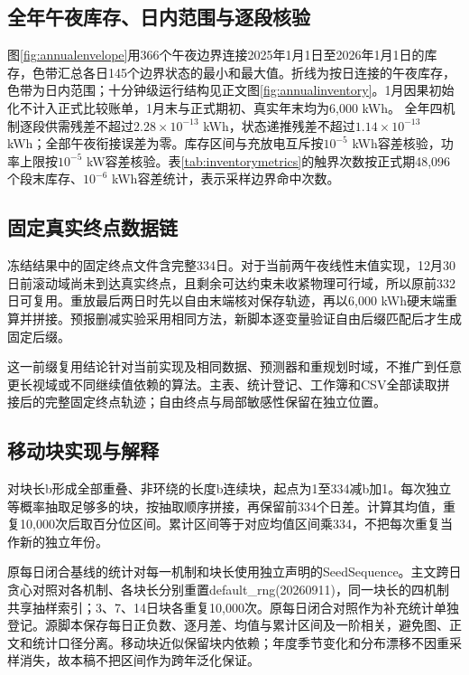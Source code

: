 

\subsection{全年午夜库存、日内范围与逐段核验}\label{app:annualinventory}
图\ref{fig:annualenvelope}用366个午夜边界连接2025年1月1日至2026年1月1日的库存，色带汇总各日145个边界状态的最小和最大值。折线为按日连接的午夜库存，色带为日内范围；十分钟级运行结构见正文图\ref{fig:annualinventory}。1月因果初始化不计入正式比较账单，1月末与正式期初、真实年末均为6,000 kWh。
全年四机制逐段供需残差不超过$2.28\times10^{-13}$ kWh，状态递推残差不超过$1.14\times10^{-13}$ kWh；全部午夜衔接误差为零。库存区间与充放电互斥按$10^{-5}$ kWh容差核验，功率上限按$10^{-5}$ kW容差核验。表\ref{tab:inventorymetrics}的触界次数按正式期48,096个段末库存、$10^{-6}$ kWh容差统计，表示采样边界命中次数。


\subsection{固定真实终点数据链}
冻结结果中的固定终点文件含完整334日。对于当前两午夜线性末值实现，12月30日前滚动域尚未到达真实终点，且剩余可达约束未收紧物理可行域，所以原前332日可复用。重放最后两日时先以自由末端核对保存轨迹，再以6,000 kWh硬末端重算并拼接。预报删减实验采用相同方法，新脚本逐变量验证自由后缀匹配后才生成固定后缀。

这一前缀复用结论针对当前实现及相同数据、预测器和重规划时域，不推广到任意更长视域或不同继续值依赖的算法。主表、统计登记、工作簿和CSV全部读取拼接后的完整固定终点轨迹；自由终点与局部敏感性保留在独立位置。

\subsection{移动块实现与解释}
对块长b形成全部重叠、非环绕的长度b连续块，起点为1至334减b加1。每次独立等概率抽取足够多的块，按抽取顺序拼接，再保留前334个日差。计算其均值，重复10,000次后取百分位区间。累计区间等于对应均值区间乘334，不把每次重复当作新的独立年份。

原每日闭合基线的统计对每一机制和块长使用独立声明的SeedSequence。主文跨日贪心对照对各机制、各块长分别重置default\_rng(20260911)，同一块长的四机制共享抽样索引；3、7、14日块各重复10,000次。原每日闭合对照作为补充统计单独登记。源脚本保存每日正负数、逐月差、均值与累计区间及一阶相关，避免图、正文和统计口径分离。移动块近似保留块内依赖；年度季节变化和分布漂移不因重采样消失，故本稿不把区间作为跨年泛化保证。




